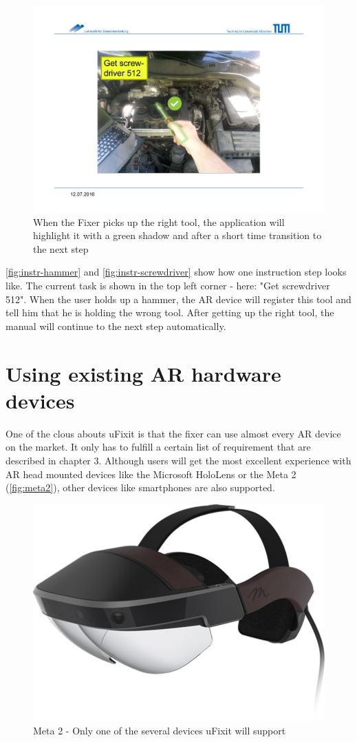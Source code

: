 		\begin{figure}[H]
			\includegraphics[width=\textwidth, trim=4cm 3cm 4cm 4cm, clip]{../images/instr-screwdriver.pdf}
			\centering
			\caption{When the Fixer picks up the right tool, the application will highlight it with a green shadow and after a short time transition to the next step}
			\label{fig:instr-screwdriver}
		\end{figure}
		
		\autoref{fig:instr-hammer} and \autoref{fig:instr-screwdriver} show how one instruction step looks like. The current task is shown in the top left corner - here: "Get screwdriver 512". When the user holds up a hammer, the AR device will register this tool and tell him that he is holding the wrong tool. After getting up the right tool, the manual will continue to the next step automatically.
		
	
	\section{Using existing AR hardware devices}
	
		One of the clous abouts uFixit is that the fixer can use almost every AR device on the market. It only has to fulfill a certain list of requirement that are described in chapter 3. Although users will get the most excellent experience with AR head mounted devices like the Microsoft HoloLens or the Meta 2 (\autoref{fig:meta2}), other devices like smartphones are also supported.
		
		\begin{figure}[H]
			\centering
			\includegraphics[width=0.5\linewidth]{../images/meta2.png}
			\caption{Meta 2 - Only one of the several devices uFixit will support}
			\label{fig:meta2}
		\end{figure}
		

